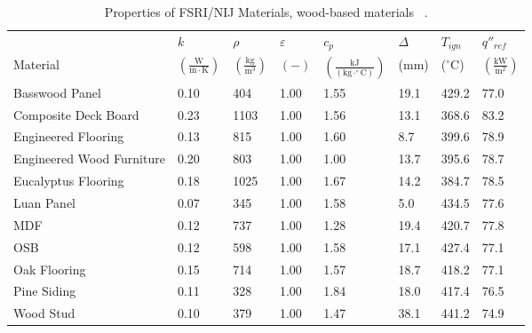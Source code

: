 \clearpage

\begin{table}[!h]
\caption[Properties of FSRI/NIJ Materials, wood-based materials]{Properties of FSRI/NIJ Materials, wood-based materials ~\cite{McKinnon:FSRI2023_Data}.}
\centering
\begin{tabular}{|p{5.5cm}|p{1.0cm}|p{1.0cm}|p{0.8cm}|p{1.4cm}|p{1.0cm}|p{1.0cm}|p{1.2cm}|}
\hline
                                               & $k$    & $\rho$      & $\varepsilon$   & $c_{p}$ & $\Delta$    & $T_{ign}$ & $q''_{ref}$ \\
Material                                       & $\mathrm{\left(\frac{W}{m\cdot K}\right)}$ & $\mathrm{\left(\frac{kg}{m^{3}}\right)}$ & $\mathrm{( - )}$ & $\mathrm{\left(\frac{kJ}{(kg\cdot ^{\circ}C)}\right)}$ &  ($\mathrm{mm}$)   & ($\mathrm{^{\circ}C}$) & $\mathrm{\left(\frac{kW}{m^{2}}\right)}$ \\ \hline
\hline
Basswood Panel & 0.10 & 404 & 1.00 & 1.55 & 19.1 & 429.2 & 77.0 \\ \hline 
Composite Deck Board & 0.23 & 1103 & 1.00 & 1.56 & 13.1 & 368.6 & 83.2 \\ \hline 
Engineered Flooring & 0.13 & 815 & 1.00 & 1.60 & 8.7 & 399.6 & 78.9 \\ \hline 
Engineered Wood Furniture & 0.20 & 803 & 1.00 & 1.00 & 13.7 & 395.6 & 78.7 \\ \hline 
Eucalyptus Flooring & 0.18 & 1025 & 1.00 & 1.67 & 14.2 & 384.7 & 78.5 \\ \hline 
Luan Panel & 0.07 & 345 & 1.00 & 1.58 & 5.0 & 434.5 & 77.6 \\ \hline 
MDF & 0.12 & 737 & 1.00 & 1.28 & 19.4 & 420.7 & 77.8 \\ \hline 
OSB & 0.12 & 598 & 1.00 & 1.58 & 17.1 & 427.4 & 77.1 \\ \hline 
Oak Flooring & 0.15 & 714 & 1.00 & 1.57 & 18.7 & 418.2 & 77.1 \\ \hline 
Pine Siding & 0.11 & 328 & 1.00 & 1.84 & 18.0 & 417.4 & 76.5 \\ \hline 
Wood Stud & 0.10 & 379 & 1.00 & 1.47 & 38.1 & 441.2 & 74.9 \\ \hline 
\end{tabular}
\label{Properties_FSRI_NIJ_Materials_woods}
\end{table}

